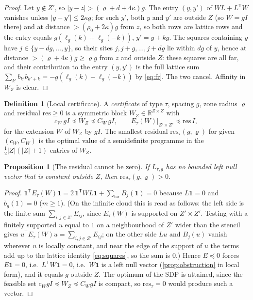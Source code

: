 \documentclass[11pt,a4paper]{article}
\theoremstyle{plain}
\newtheorem{proposition}[theorem]{Proposition}
\theoremstyle{definition}
\newtheorem{definition}[theorem]{Definition}
\theoremstyle{remark}
\numberwithin{equation}{section}
\newcommand{\R}{\mathbb{R}}
\newcommand{\res}{\mathrm{res}}
\begin{document}
\begin{proof}
Let $y\notin Z'$, so $|y-z|>(\varrho+d+4\kappa)g$. The entry $(y,y')$ of $WL+L^{\mathsf T}W$ vanishes unless $|y-y'|\le2\kappa g$; for such $y'$, both $y$ and $y'$ are outside $Z$ (so $W=gI$ there) and at distance $>(\rho_0+2\kappa)g$ from $z$, so both rows are lattice rows and the entry equals $g(\ell_g(k)+\ell_g(-k))$, $y'=y+kg$. The squares containing $y$ have $j\in\{y-dg,\dots,y\}$, so their sites $j,j+g,\dots,j+dg$ lie within $dg$ of $y$, hence at distance $>(\varrho+4\kappa)g\ge\varrho g$ from $z$ and outside $Z$: these squares are all far, and their contribution to the entry $(y,y')$ is the full lattice sum $\sum_{k'}b_{k'}b_{k'+k}=-g(\ell_g(k)+\ell_g(-k))$ by \eqref{eq:fr}. The two cancel. Affinity in $W_Z$ is clear.
\end{proof}

\begin{definition}[Local certificate]\label{def:cert}
A \emph{certificate} of type $\tau$, spacing $g$, zone radius $\varrho$ and residual $\res\ge0$ is a symmetric block $W_Z\in\R^{Z\times Z}$ with
\begin{equation}\label{eq:cert}
c_W\,gI\preceq W_Z\preceq C_W\,gI,\qquad E_\tau(W)\big|_{Z'\times Z'}\preceq \res\,I ,
\end{equation}
for the extension $W$ of $W_Z$ by $gI$. The smallest residual $\res_\tau(g,\varrho)$ for given $(c_W,C_W)$ is the optimal value of a semidefinite programme in the $\frac12|Z|(|Z|+1)$ entries of $W_Z$.
\end{definition}

\begin{proposition}[The residual cannot be zero]\label{prop:residual}
If $L_{\tau,g}$ has no bounded left null vector that is constant outside $Z$, then $\res_\tau(g,\varrho)>0$.
\end{proposition}

\begin{proof}
$\mathbf 1^{\mathsf T}E_\tau(W)\mathbf 1=2\,\mathbf 1^{\mathsf T}WL\mathbf 1+\sum_{\mathrm{far}}B_j(\mathbf 1)=0$ because $L\mathbf 1=0$ and $b_g(1)=0$ ($m\ge1$). (On the infinite cloud this is read as follows: the left side is the finite sum $\sum_{i,j\in Z'}E_{ij}$, since $E_\tau(W)$ is supported on $Z'\times Z'$. Testing with a finitely supported $u$ equal to $1$ on a neighbourhood of $Z'$ wider than the stencil gives $u^{\mathsf T}E_\tau(W)u=\sum_{i,j\in Z'}E_{ij}$; on the other side $Lu$ and $B_j(u)$ vanish wherever $u$ is locally constant, and near the edge of the support of $u$ the terms add up to the lattice identity \eqref{eq:squares}, so the sum is $0$.) Hence $E\preceq0$ forces $E\mathbf 1=0$, i.e.\ $L^{\mathsf T}W\mathbf 1=0$, i.e.\ $W\mathbf 1$ is a left null vector (\cref{prop:obstruction} in local form), and it equals $g$ outside $Z$. The optimum of the SDP is attained, since the feasible set $c_WgI\preceq W_Z\preceq C_WgI$ is compact, so $\res_\tau=0$ would produce such a vector.
\end{proof}
\end{document}
